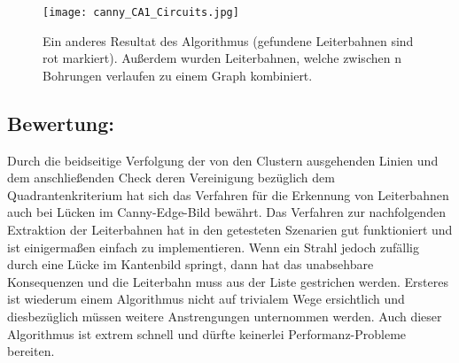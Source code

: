 \begin{figure}[H]
  \begin{center}
    \texttt{[image: canny\_CA1\_Circuits.jpg]}
    \caption{Ein anderes Resultat des Algorithmus (gefundene Leiterbahnen sind rot markiert). Außerdem wurden Leiterbahnen, welche zwischen n Bohrungen verlaufen zu einem Graph kombiniert.}
    \label{fig:linepoints22}
  \end{center}
\end{figure}

\subsection{Bewertung:}
Durch die beidseitige Verfolgung der von den Clustern ausgehenden Linien und dem anschließenden Check deren Vereinigung bezüglich dem Quadrantenkriterium hat sich das Verfahren für die Erkennung von Leiterbahnen auch bei Lücken im Canny-Edge-Bild bewährt. \newline
Das Verfahren zur nachfolgenden Extraktion der Leiterbahnen hat in den getesteten Szenarien gut funktioniert und ist einigermaßen einfach zu implementieren. \newline
Wenn ein Strahl jedoch zufällig durch eine Lücke im Kantenbild springt, dann hat das unabsehbare Konsequenzen und die Leiterbahn muss aus der Liste gestrichen werden. Ersteres ist wiederum einem Algorithmus nicht auf trivialem Wege ersichtlich und diesbezüglich müssen weitere Anstrengungen unternommen werden. \newline
Auch dieser Algorithmus ist extrem schnell und dürfte keinerlei Performanz-Probleme bereiten. 